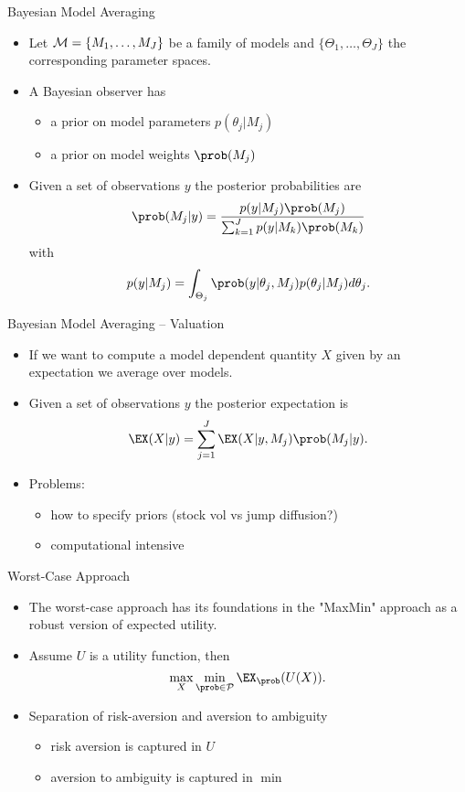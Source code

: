 {Bayesian Model Averaging}
\begin{itemize}
\item<1-> Let ${\cal M}= \{M_1, \dots, M_J\}$ be a family of models and  $\{\Theta_1, \dots, \Theta_J\}$ the corresponding parameter spaces.
\item<2->  A Bayesian observer has
\begin{itemize}
\item a prior on model parameters $p(\theta_j|M_j)$
\item a prior on model weights $\prob(M_j)$
\end{itemize}
\item<3-> Given a set of observations $y$ the posterior probabilities are
$$
\prob(M_j|y) = \frac{p(y|M_j)\prob(M_j)}{\sum_{k=1}^{J}p(y|M_k)\prob(M_k)}
$$
with
$$
p(y|M_j)=\int_{\Theta_j} \prob(y|\theta_j, M_j)p(\theta_j|M_j) d\theta_j.
$$
\end{itemize}

{Bayesian Model Averaging -- Valuation}
\begin{itemize}
\item<1-> If we want to compute a model dependent quantity $X$ given by an expectation we average over models.
\item<2-> Given a set of observations $y$ the posterior expectation is
$$
\EX(X|y) = \sum_{j=1}^{J} \EX(X |y, M_j) \prob(M_j |y).
$$
\item<3-> Problems:
\begin{itemize}
\item how to specify priors (stock vol vs jump diffusion?)
\item computational intensive
\end{itemize}

\end{itemize}

{Worst-Case Approach}
\begin{itemize}
\item<1-> The worst-case approach has its foundations in the "MaxMin" approach as a robust version of expected utility. \item<2-> Assume $U$ is a utility function, then
$$
\max _X \min_{\prob \in {\cal P}} \EX_{\prob}(U(X)).
$$
\item<3-> Separation of risk-aversion and aversion to ambiguity
\begin{itemize}
\item risk aversion is captured in $U$
\item aversion to ambiguity is captured in $\min$
\end{itemize}

\end{itemize}


